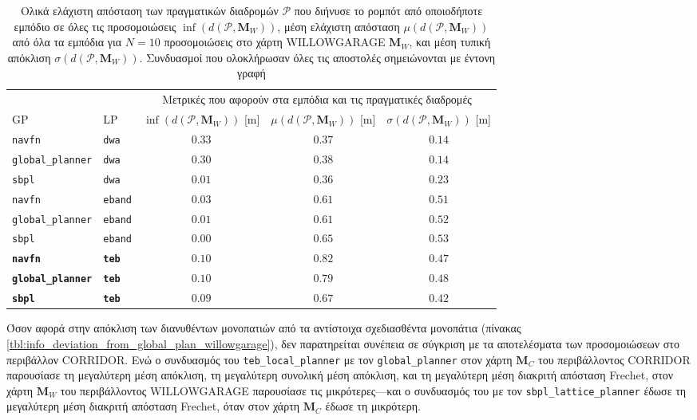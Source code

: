 \begin{table}[h]\hspace{-0.7cm}
\renewcommand{\arraystretch}{1.3}
\begin{tabular}{llccc}
  & & \multicolumn{3}{c}{Μετρικές που αφορούν στα εμπόδια και τις πραγματικές διαδρομές} \\
  \cline{3-5}
  GP & LP & $\inf(d(\bm{\mathcal{P}},\bm{M}_W))$ [m] & $\mu(d(\bm{\mathcal{P}},\bm{M}_W))$ [m] & $\sigma(d(\bm{\mathcal{P}},\bm{M}_W))$ [m] \\ \toprule
  \texttt{navfn} & \texttt{dwa} & $0.33$ & $0.37$ & $0.14$ \\
  \texttt{global\_planner} & \texttt{dwa} & $0.30$ & $0.38$ & $0.14$ \\
  \texttt{sbpl} & \texttt{dwa} & $0.01$ & $0.36$ & $0.23$ \\
  \texttt{navfn} & \texttt{eband} & $0.03$ & $0.61$ & $0.51$ \\
  \texttt{global\_planner} & \texttt{eband} & $0.01$ & $0.61$ & $0.52$ \\
  \texttt{sbpl} & \texttt{eband} & $0.00$ & $0.65$ & $0.53$ \\
  \textbf{\texttt{navfn}} & \textbf{\texttt{teb}} & $\bm{0.10}$ & $\bm{0.82}$ & $\bm{0.47}$ \\
  \textbf{\texttt{global\_planner}} & \textbf{\texttt{teb}} & $\bm{0.10}$ & $\bm{0.79}$ & $\bm{0.48}$ \\
  \textbf{\texttt{sbpl}} & \textbf{\texttt{teb}} & $\bm{0.09}$ & $\bm{0.67}$ & $\bm{0.42}$ \\ \bottomrule
\end{tabular}
\caption{\small Ολικά ελάχιστη απόσταση των πραγματικών διαδρομών
         $\bm{\mathcal{P}}$ που διήνυσε το ρομπότ από οποιοδήποτε εμπόδιο σε
         όλες τις προσομοιώσεις $\inf(d(\bm{\mathcal{P}},\bm{M}_W))$, μέση
         ελάχιστη απόσταση $\mu(d(\bm{\mathcal{P}},\bm{M}_W))$ από όλα τα
         εμπόδια για $N=10$ προσομοιώσεις στο χάρτη WILLOWGARAGE $\bm{M}_W$, και μέση τυπική απόκλιση
         $\sigma(d(\bm{\mathcal{P}},\bm{M}_W))$. Συνδυασμοί που
         ολοκλήρωσαν όλες τις αποστολές σημειώνονται με έντονη γραφή}
\label{tbl:info_ground_truth_map_willowgarage}
\end{table}

Όσον αφορά στην απόκλιση των διανυθέντων μονοπατιών από τα αντίστοιχα
σχεδιασθέντα μονοπάτια (πίνακας
\ref{tbl:info_deviation_from_global_plan_willowgarage}), δεν παρατηρείται
συνέπεια σε σύγκριση με τα αποτελέσματα των προσομοιώσεων στο περιβάλλον
CORRIDOR. Ενώ ο συνδυασμός του \texttt{teb\_local\_planner} με τον
\texttt{global\_planner}  στον χάρτη $\bm{M}_C$ του περιβάλλοντος CORRIDOR
παρουσίασε τη μεγαλύτερη μέση απόκλιση, τη μεγαλύτερη συνολική μέση απόκλιση,
και τη μεγαλύτερη μέση διακριτή απόσταση Frechet, στον χάρτη $\bm{M}_W$ του
περιβάλλοντος WILLOWGARAGE παρουσίασε τις μικρότερες---και ο συνδυασμός του με
τον \texttt{sbpl\_lattice\_planner} έδωσε τη μεγαλύτερη μέση διακριτή απόσταση
Frechet, όταν στον χάρτη $\bm{M}_C$ έδωσε τη μικρότερη.

